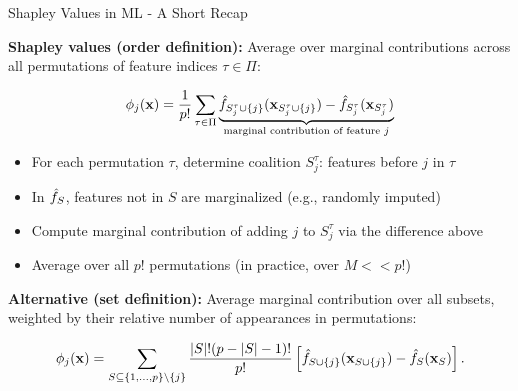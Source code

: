 \documentclass[10pt,compress,t,notes=noshow, xcolor=table]{beamer}
\newcommand{\Stau}{S_{j}^\tau}%
\newcommand{\Stauj}{\Stau \cup \{j\}}
\begin{document}
\begin{frame}{Shapley Values in ML - A Short Recap}

% 
% 
\textbf{Shapley values (order definition):} Average over marginal contributions across all permutations of feature indices $\tau \in \Pi$:

\[
\phi_j(\xv) = \frac{1}{p!} \sum_{\tau \in \Pi} 
\underbrace{\fh_{\Stauj}(\xv_{\Stauj}) - \fh_{\Stau}(\xv_{\Stau})}_{\text{marginal contribution of feature $j$}}
\]

\begin{itemize}
  \item For each permutation $\tau$, determine coalition $\Stau$: features before $j$ in $\tau$
  \item In \(\hat{f}_S\), features not in \(S\) are marginalized (e.g., randomly imputed)
  \item Compute marginal contribution of adding $j$ to $\Stau$ via the difference above
  \item Average over all $p!$ permutations (in practice, over $M << p!$)
\end{itemize}

\pause\medskip

\textbf{Alternative (set definition):} Average marginal contribution over all subsets, weighted by their relative number of appearances in permutations:

\[
\phi_j(\mathbf{x}) = 
\sum_{S \subseteq \{1,\dots,p\} \setminus \{j\}} \frac{|S|!(p - |S| - 1)!}{p!} \left[\hat{f}_{S \cup \{j\}}(\mathbf{x}_{S \cup \{j\}}) - \hat{f}_S(\mathbf{x}_S)\right].
\]
% 
% 

\end{frame}
\end{document}
